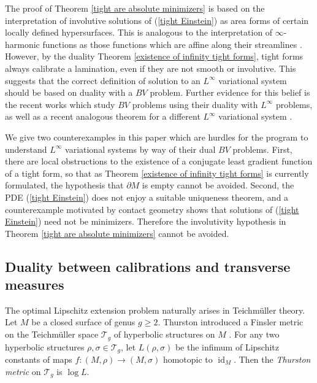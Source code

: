 \documentclass[reqno,11pt]{amsart}
\DeclareMathOperator{\id}{id}
\newcommand{\dfn}[1]{\emph{#1}\index{#1}}
\theoremstyle{definition}
\numberwithin{equation}{section}
\begin{document}
The proof of Theorem \ref{tight are absolute minimizers} is based on the interpretation of involutive solutions of (\ref{tight Einstein}) as area forms of certain locally defined hypersurfaces.
This is analogous to the interpretation of $\infty$-harmonic functions as those functions which are affine along their streamlines \cite[Theorem 1.5]{Sheffield12}.
However, by the duality Theorem \ref{existence of infinity tight forms}, tight forms always calibrate a lamination, even if they are not smooth or involutive.
This suggests that the correct definition of solution to an $L^\infty$ variational system should be based on duality with a $BV$ problem.
Further evidence for this belief is the recent works \cite{Mazon14,górny2021applications,górny2022dualitybased} which study $BV$ problems using their duality with $L^\infty$ problems, as well as a recent analogous theorem for a different $L^\infty$ variational system \cite{katzourakis2024minimisers}.

We give two counterexamples in this paper which are hurdles for the program to understand $L^\infty$ variational systems by way of their dual $BV$ problems.
First, there are local obstructions to the existence of a conjugate least gradient function of a tight form, so that as Theorem \ref{existence of infinity tight forms} is currently formulated, the hypothesis that $\partial M$ is empty cannot be avoided.
Second, the PDE (\ref{tight Einstein}) does not enjoy a suitable uniqueness theorem, and a counterexample motivated by contact geometry shows that solutions of (\ref{tight Einstein}) need not be minimizers.
Therefore the involutivity hypothesis in Theorem \ref{tight are absolute minimizers} cannot be avoided.

\subsection{Duality between calibrations and transverse measures}
The optimal Lipschitz extension problem naturally arises in Teichm\"uller theory.
Let $M$ be a closed surface of genus $g \geq 2$.
Thurston introduced a Finsler metric on the Teichm\"uller space $\mathscr T_g$ of hyperbolic structures on $M$ \cite{Thurston98}.
For any two hyperbolic structures $\rho, \sigma \in \mathscr T_g$, let $L(\rho, \sigma)$ be the infimum of Lipschitz constants of maps $f: (M, \rho) \to (M, \sigma)$ homotopic to $\id_M$.
Then the \dfn{Thurston metric} on $\mathscr T_g$ is $\log L$.
\end{document}
